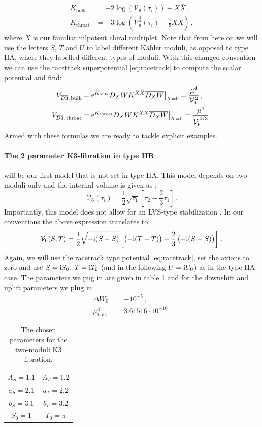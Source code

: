 \documentclass[a4paper,12pt]{report}
\newcommand{\be}{\begin{equation}}
\newcommand{\ee}{\end{equation}}
\newcommand{\bea}{\begin{equation}\begin{aligned}}
\newcommand{\eea}{\end{aligned}\end{equation}}
\def\rmi{{\rm i}}
\def\rme{{\rm e}}
\begin{document}
\bea
K_{\text{bulk}} &= -2 \log \left( \mathcal{V}_6 (\tau_i)\right) + X\bar{X}\,,\\
K_{\text{throat}} &= -3 \log \left( \mathcal{V}^ {\frac{2}{3}}_6 (\tau_i) - \frac{1}{3} X\bar{X}\right)\,,
\eea
where $X$ is our familiar nilpotent chiral multiplet. Note that from here on we will use the letters $S$, $T$ and $U$ to label different Kähler moduli, as opposed to type IIA, where they labelled different types of moduli. With this changed convention we can use the racetrack superpotential \eqref{eq:racetrack} to compute the scalar potential and find:
\bea 
V_{\overline{D3},\,\text{bulk}} &= \rme^{K_{\text{bulk}}} D_X W K^{X\bar{X}} \overline{D_X W}\big|_{X=0} = \frac{\mu^4}{\mathcal{V}_6^{\,2}}\,,\\
V_{\overline{D3},\,\text{throat}} &=  \rme^{K_{\text{throat}}} D_X W K^{X\bar{X}} \overline{D_X W}\big|_{X=0} = \frac{\mu^4}{\mathcal{V}_6^{\,4/3}}\,.
\eea
Armed with these formulas we are ready to tackle explicit examples.


\paragraph{The 2 parameter K3-fibration in type IIB} will be our first model that is not set in type IIA. This model depends on two moduli only and the internal volume is given as \cite{Cicoli:2008va}:
\be 
\mathcal{V}_6 (\tau_i) = \frac{1}{2} \sqrt{\tau_1} \left[\tau_2 - \frac{2}{3} \tau_1 \right]\,.
\ee
Importantly, this model does not allow for an LVS-type stabilization \cite{Balasubramanian:2005zx}. In our conventions the above expression translates to:
\be 
\mathcal{V}_6(S,T) = \frac{1}{2} \sqrt{-\rmi (S-\bar{S})} \left[ \left( -\rmi (T-\bar{T}) \right) - \frac{2}{3} \left( -\rmi (S-\bar{S})\right) \right]\,.
\ee
Again, we will use the racetrack type potential \eqref{eq:racetrack}, set the axions to zero and use $S=\rmi S_0$, $T=\rmi T_0$ (and in the following $U=\rmi U_0$) as in the type IIA case. The parameters we pug in are given in table \ref{tab:2modK3para} and for the downshift and uplift parameters we plug in:
\bea 
\Delta W_0 &= -10^{-5}\,,\\
\mu_{\text{bulk}}^4 &= 3.61516 \cdot 10^{-10}\,.
\eea
\begin{table}[htb]
\centering
\begin{tabular}{|c|c|}\hline
$A_S = 1.1$ & $A_T = 1.2$ \\\hline
$a_S = 2.1$ & $a_T = 2.2$ \\\hline
$b_S = 3.1$ & $b_T = 3.2$ \\\hline
$S_0 = 1$ & $T_0 = \pi$ \\\hline
\end{tabular}
\caption{ The chosen parameters for the two-moduli K3 fibration.}
\label{tab:2modK3para}
\end{table}
\end{document}
